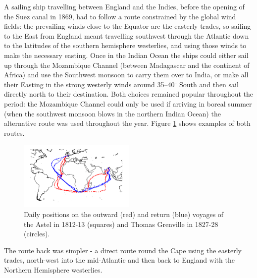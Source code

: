 \documentclass[CP]{copernicus}
\begin{document}
A sailing ship travelling between England and the Indies, before the opening of the Suez canal in 1869, had to follow a route constrained by the global wind fields: the prevailing winds close to the Equator are the easterly trades, so sailing to the East from England meant travelling southwest through the Atlantic down to the latitudes of the southern hemisphere westerlies, and using those winds to make the necessary easting. Once in the Indian Ocean the ships could either sail up through the Mozambique Channel (between Madagascar and the continent of Africa) and use the Southwest monsoon to carry them over to India, or make all their Easting in the strong westerly winds around 35--40$^\circ$ South and then sail directly north to their destination. Both choices remained popular throughout the period: the Mozambique Channel could only be used if arriving in boreal summer (when the southwest monsoon blows in the northern Indian Ocean) the alternative route was used throughout the year. Figure \ref{Fsroc2} shows examples of both routes.
\begin{figure}[!hbp]
\begin{center}
\includegraphics[angle=0, width=0.5\textwidth]{fig3.pdf}
\caption{Daily positions on the outward (red) and return (blue) voyages of the Astel in 1812-13 (squares) and Thomas Grenville in 1827-28 (circles).}
\label{Fsroc2}
\end{center}
\end{figure}
The route back was simpler - a direct route round the Cape using the easterly trades, north-west into the mid-Atlantic and then back to England with the Northern Hemisphere westerlies.
\end{document}
